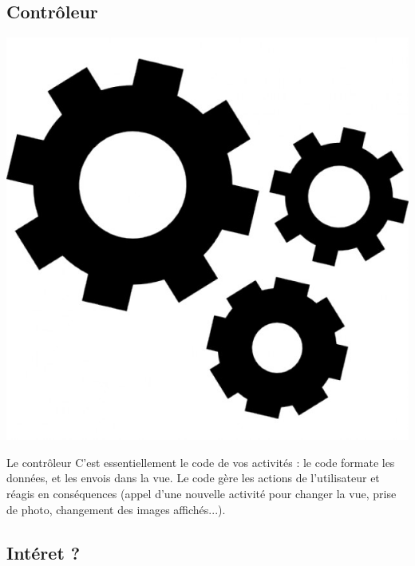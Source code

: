 \documentclass{beamer}
\begin{document}
\subsection{Contrôleur}
\begin{frame}
\begin{center}
\includegraphics[scale=0.2]{controler.jpeg}
\end{center}
\begin{block}{Le contrôleur}
C'est essentiellement le code de vos activités : le code formate les données, et les envois dans la vue. Le code gère les actions de l’utilisateur et réagis en conséquences (appel d'une nouvelle activité pour changer la vue, prise de photo, changement des images affichés...).
\end{block}
\end{frame}

\subsection{Intéret ?}
\end{document}
